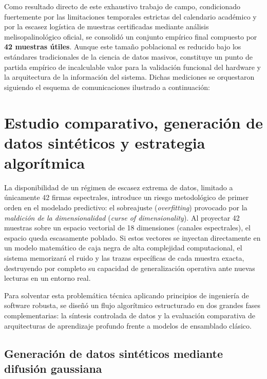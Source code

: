 Como resultado directo de este exhaustivo trabajo de campo, condicionado fuertemente por las limitaciones temporales estrictas del calendario académico y por la escasez logística de muestras certificadas mediante análisis melisopalinológico oficial, se consolidó un conjunto empírico final compuesto por \textbf{42 muestras útiles}. Aunque este tamaño poblacional es reducido bajo los estándares tradicionales de la ciencia de datos masivos, constituye un punto de partida empírico de incalculable valor para la validación funcional del hardware y la arquitectura de la información del sistema. Dichas mediciones se orquestaron siguiendo el esquema de comunicaciones ilustrado a continuación:


\section{Estudio comparativo, generación de datos sintéticos y estrategia algorítmica}

La disponibilidad de un régimen de escasez extrema de datos, limitado a únicamente 42 firmas espectrales, introduce un riesgo metodológico de primer orden en el modelado predictivo: el sobreajuste (\textit{overfitting}) provocado por la \textit{maldición de la dimensionalidad} (\textit{curse of dimensionality}). Al proyectar 42 muestras sobre un espacio vectorial de 18 dimensiones (canales espectrales), el espacio queda escasamente poblado. Si estos vectores se inyectan directamente en un modelo matemático de caja negra de alta complejidad computacional, el sistema memorizará el ruido y las trazas específicas de cada muestra exacta, destruyendo por completo su capacidad de generalización operativa ante nuevas lecturas en un entorno real.

Para solventar esta problemática técnica aplicando principios de ingeniería de software robusta, se diseñó un flujo algorítmico estructurado en dos grandes fases complementarias: la síntesis controlada de datos y la evaluación comparativa de arquitecturas de aprendizaje profundo frente a modelos de ensamblado clásico.

\subsection{Generación de datos sintéticos mediante difusión gaussiana}

